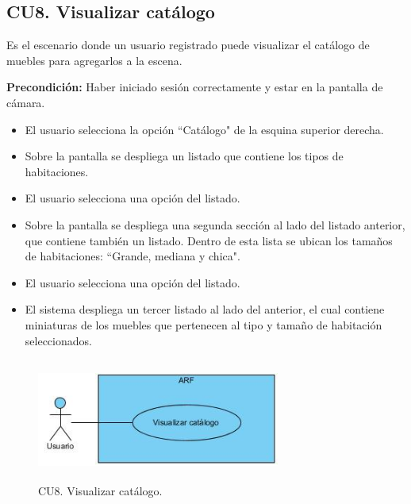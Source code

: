 \subsection{CU8. Visualizar catálogo}\par
Es el escenario donde un usuario registrado puede visualizar el catálogo de muebles para agregarlos a la escena.\par
\textbf{Precondición:} Haber iniciado sesión correctamente y estar en la pantalla de cámara.\par
\begin{itemize}
	\item El usuario selecciona la opción ``Catálogo" de la esquina superior derecha.
	\item Sobre la pantalla se despliega un listado que contiene los tipos de habitaciones.
	\item El usuario selecciona una opción del listado.
	\item Sobre la pantalla se despliega una segunda sección al lado del listado anterior, que contiene también un listado. Dentro de esta lista se ubican los tamaños de habitaciones: ``Grande, mediana y chica".
	\item El usuario selecciona una opción del listado.
	\item El sistema despliega un tercer listado al lado del anterior, el cual contiene miniaturas de los muebles que pertenecen al tipo y tamaño de habitación seleccionados.
\end{itemize}

\begin{figure}[h!]
	\centering
	\includegraphics[width=8cm,height=4cm]{imagenes/analisis/cu/visualizar_catalogo.jpg}
	\caption{CU8. Visualizar catálogo.}
	\label{fig:visualizarcatalogo}
\end{figure} 

